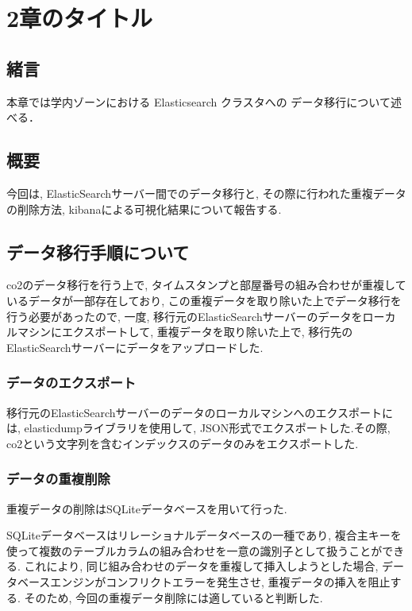 
\chapter{2章のタイトル}
\label{chap:second}


\section{緒言}
本章では学内ゾーンにおける Elasticsearch クラスタへの
データ移行について述べる．

\section{概要}
今回は, ElasticSearchサーバー間でのデータ移行と, その際に行われた重複データの削除方法, kibanaによる可視化結果について報告する.

\section{データ移行手順について}

co2のデータ移行を行う上で, タイムスタンプと部屋番号の組み合わせが重複しているデータが一部存在しており, この重複データを取り除いた上でデータ移行を行う必要があったので, 一度, 移行元のElasticSearchサーバーのデータをローカルマシンにエクスポートして, 重複データを取り除いた上で, 移行先のElasticSearchサーバーにデータをアップロードした.

\subsection{データのエクスポート}
移行元のElasticSearchサーバーのデータのローカルマシンへのエクスポートには, elasticdumpライブラリを使用して, JSON形式でエクスポートした.その際, co2という文字列を含むインデックスのデータのみをエクスポートした.

\subsection{データの重複削除}
重複データの削除はSQLiteデータベースを用いて行った.

SQLiteデータベースはリレーショナルデータベースの一種であり, 複合主キーを使って複数のテーブルカラムの組み合わせを一意の識別子として扱うことができる. これにより, 同じ組み合わせのデータを重複して挿入しようとした場合, データベースエンジンがコンフリクトエラーを発生させ, 重複データの挿入を阻止する. そのため, 今回の重複データ削除には適していると判断した.

